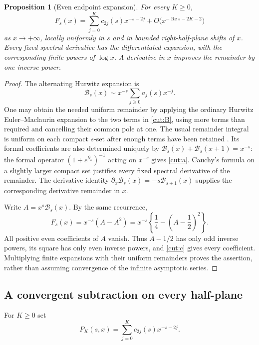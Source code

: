 \documentclass[11pt]{article}
\newtheorem{proposition}[theorem]{Proposition}
\theoremstyle{definition}
\theoremstyle{remark}
\numberwithin{equation}{section}
\newcommand{\Rea}{\operatorname{Re}}
\begin{document}
\begin{proposition}[Even endpoint expansion]\label{cut:expansion}
For every $K\ge0$,
\begin{equation}\label{cut:expansioneq}
 F_s(x)=\sum_{j=0}^{K}c_{2j}(s)x^{-s-2j}
           +O\bigl(x^{-\Rea s-2K-2}\bigr)
\end{equation}
as $x\to+\infty$, locally uniformly in $s$ and in bounded right-half-plane
shifts of $x$. Every fixed spectral derivative has the differentiated
expansion, with the corresponding finite powers of $\log x$. A derivative
in $x$ improves the remainder by one inverse power.
\end{proposition}
\begin{proof}
The alternating Hurwitz expansion is
\[
 \mathcal B_s(x)\sim x^{-s}\sum_{j\ge0}a_j(s)x^{-j}.
\]
One may obtain the needed uniform remainder by applying the ordinary
Hurwitz Euler--Maclaurin expansion to the two terms in \eqref{cut:B},
using more terms than required and cancelling their common pole at one.
The usual remainder integral is uniform on each compact $s$-set after
enough terms have been retained \cite{DLMFZeta,HuKimAsymptotic}.
Its formal coefficients are also determined uniquely by
$\mathcal B_s(x)+\mathcal B_s(x+1)=x^{-s}$: the formal operator
$(1+e^{\partial_x})^{-1}$ acting on $x^{-s}$ gives \eqref{cut:a}.
Cauchy's formula on a slightly larger compact set justifies every fixed
spectral derivative of the remainder. The derivative identity
$\partial_x\mathcal B_s(x)=-s\mathcal B_{s+1}(x)$ supplies the
corresponding derivative remainder in $x$.

Write $A=x^s\mathcal B_s(x)$. By the same recurrence,
\[
 F_s(x)=x^{-s}(A-A^2)
       =x^{-s}\left\{\frac14-\left(A-\frac12\right)^2\right\}.
\]
All positive even coefficients of $A$ vanish. Thus $A-1/2$ has only
odd inverse powers, its square has only even inverse powers, and
\eqref{cut:c} gives every coefficient. Multiplying finite expansions with
their uniform remainders proves the assertion, rather than assuming
convergence of the infinite asymptotic series.
\end{proof}

\subsection{A convergent subtraction on every half-plane}

For $K\ge0$ set
\begin{equation}\label{cut:PK}
 P_K(s,x)=\sum_{j=0}^{K}c_{2j}(s)x^{-s-2j}.
\end{equation}
\end{document}
